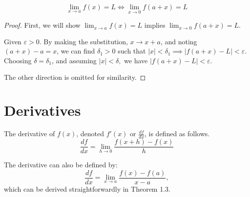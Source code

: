 \documentclass{article}
\begin{document}
\begin{theorem}
\[
\lim_{x \to a} f(x) = L \iff \lim_{x \to 0} f(a + x) = L
\]
\end{theorem}
\begin{proof}
    First, we will show $\lim_{x \to a} f(x) = L$ implies $\lim_{x \to 0} f(a + x) = L$. 
    
    Given $\varepsilon > 0$. By making the substitution, $x \to x + a$, and noting $(a + x) - a = x$, we can find $\delta_1 > 0$ such that $|x| < \delta_1 \implies |f(a + x) - L| < \varepsilon.$ Choosing $\delta = \delta_1$, and assuming $|x| < \delta,$ we have $|f(a + x) - L| < \varepsilon.$

    The other direction is omitted for similarity.
    
\end{proof}

\section{Derivatives}
\begin{definition}[Derivative]
    The derivative of $f(x)$, denoted $f'(x)$ or $\frac{df}{dx}$, is defined as follows.
    $$ \frac{df}{dx} = \lim_{h \to 0} \frac{f(x + h) - f(x)}{h}$$

    The derivative can also be defined by: 
    $$ \frac{df}{dx} = \lim_{x \to a} \frac{f(x) - f(a)}{x - a},$$
    which can be derived straightforwardly in Theorem 1.3.
\end{definition}
\end{document}
